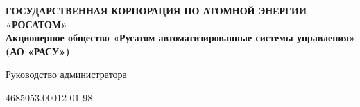 \begin{titlepage}                                                         
    \newpage                                                                        
    \begin{center}                                                        
    {\bfseries ГОСУДАРСТВЕННАЯ КОРПОРАЦИЯ ПО АТОМНОЙ ЭНЕРГИИ «РОСАТОМ» \\
    Акционерное общество «Русатом автоматизированные системы управления» (АО «РАСУ»)}                               
    \vspace{1cm}                                                          
                                                                                        
    Руководство администратора                                                              
    \vspace{6em}                                                          
                                                                                        
                                                                                        
                                                                                        
                                                                                        
     4685053.00012-01 98 \\                                                      
    \end{center}                                                          
                                                                                        

\end{titlepage}
